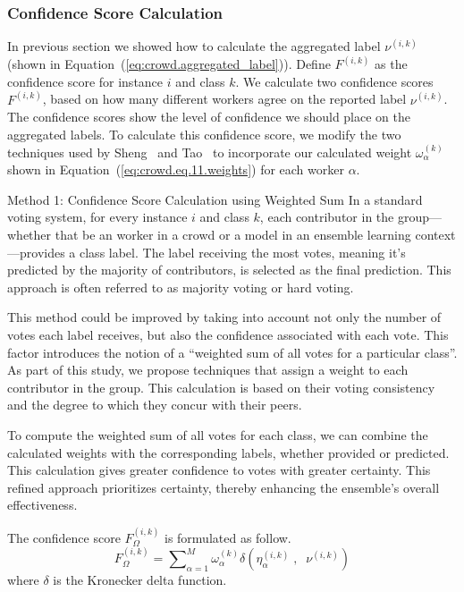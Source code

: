\subsubsection{Confidence Score Calculation}
In previous section we showed how to calculate the aggregated label $\nu^{(i,k)}$ (shown in Equation~(\ref{eq:crowd.aggregated_label})). Define $F^{(i,k)} $ as the confidence score for instance $i $ and class $k $. We calculate two confidence scores $F^{(i,k)} $, based on how many different workers agree on the reported label $\nu^{(i,k)}$. The confidence scores show the level of confidence we should place on the aggregated labels. To calculate this confidence score, we modify the two techniques used by Sheng~\cite{sheng_Majority_2019} and Tao~\cite{tao_Label_2020} to incorporate our calculated weight $\omega_{\alpha}^{(k)} $ shown in Equation~(\ref{eq:crowd.eq.11.weights})  for each worker $\alpha $.

\begin{mymdframed}{Method 1: Confidence Score Calculation using Weighted Sum}
    In a standard voting system, for every instance $i$ and class $k$, each contributor in the group—whether that be an worker in a crowd or a model in an ensemble learning context—provides a class label. The label receiving the most votes, meaning it's predicted by the majority of contributors, is selected as the final prediction. This approach is often referred to as majority voting or hard voting.

    This method could be improved by taking into account not only the number of votes each label receives, but also the confidence associated with each vote. This factor introduces the notion of a ``weighted sum of all votes for a particular class''. As part of this study, we propose techniques that assign a weight to each contributor in the group. This calculation is based on their voting consistency and the degree to which they concur with their peers.

    To compute the weighted sum of all votes for each class, we can combine the calculated weights with the corresponding labels, whether provided or predicted. This calculation gives greater confidence to votes with greater certainty. This refined approach prioritizes certainty, thereby enhancing the ensemble's overall effectiveness.

    The confidence score $F_{\Omega}^{(i,k)}$ is formulated as follow.
    \begin{equation}
        F_{\Omega}^{(i,k)} = {\sum\nolimits_{\alpha=1}^{M}{\omega_{\alpha}^{(k)} \delta\left(\eta_{\alpha}^{(i,k)} \;,\;\; \nu^{(i,k)} \right)}}
        \label{eq:crowd.Eq.13.confidence-score.Freq}
    \end{equation}
    where $\delta $ is the Kronecker delta function.

\end{mymdframed}

